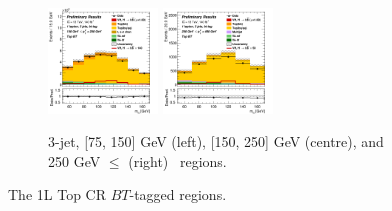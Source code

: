 \begin{figure}[h!]
\begin{subfigure}[b]{\textwidth}
        \includegraphics[width=0.32\textwidth]{Images/VH/Own_fit/prefit_VHcc/Region_distmBB_BMax250_BMin150_DtopCRBC_J3_TTypebt_T1_L1_Y6051_Prefit.png}
        \includegraphics[width=0.32\textwidth]{Images/VH/Own_fit/prefit_VHcc/Region_distmBB_BMax400_BMin250_DtopCRBC_J3_TTypebt_T1_L1_Y6051_Prefit.png}
        \caption{3-jet, [75, 150] GeV (left), [150, 250] GeV (centre), and 250 GeV $\leq$ (right) \ptv\ regions.}
        \label{fig:plots_VHcc_1L_TopCR_3J}
    \end{subfigure}
    \caption{The 1L Top CR $BT$-tagged regions.}
    \label{fig:plots_VHcc_1L_TopCR}
\end{figure}
